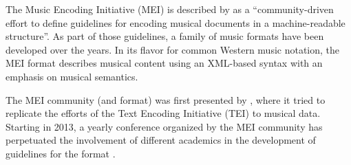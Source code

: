 

The Music Encoding Initiative (MEI) is described by \textcite{hankinson2011music} as a ``community-driven effort to define guidelines for encoding musical documents in a machine-readable structure''. As part of those guidelines, a family of music formats have been developed over the years. In its flavor for common Western music notation, the MEI format describes musical content using an XML-based syntax with an emphasis on musical semantics.


The MEI community (and format) was first presented by \textcite{roland2002music}, where it tried to replicate the efforts of the Text Encoding Initiative (TEI) to musical data. Starting in 2013, a yearly conference organized by the MEI community has perpetuated the involvement of different academics in the development of guidelines for the format \cite{crawford2016review}.


